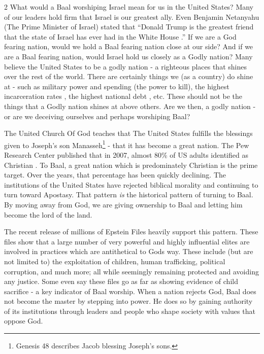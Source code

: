 \documentclass[10pt]{article}
\begin{document}
\begin{multicols}{2}
What would a Baal worshiping Israel mean for us in the United States? Many of our leaders hold firm that Israel is our greatest ally. Even Benjamin Netanyahu (The Prime Minister of Israel) stated that ``Donald Trump is the greatest friend that the state of Israel has ever had in the White House \cite{msn}.'' If we are a God fearing nation, would we hold a Baal fearing nation close at our side? And if we are a Baal fearing nation, would Israel hold us closely as a Godly nation? Many believe the United States to be a godly nation - a righteous places that shines over the rest of the world. There are certainly things we (as a country) do shine at - such as military power and spending (the power to kill)\cite{SIPRI}, the highest incarceration rates \cite{prisonpolicy}, the highest national debt \cite{economic comittee, traasuryDirect}, etc. These should not be the things that a Godly nation shines at above others. Are we then, a godly nation - or are we deceiving ourselves and perhaps worshiping Baal?

The United Church Of God teaches that The United States fulfills the blessings given to Joseph's son Manasseh\footnote{Genesis 48 describes Jacob blessing Joseph's sons.} \cite{UCG Prophecy} - that it has become a great nation. The Pew Research Center published that in 2007, almost 80\% of US adults identified as Christian \cite{Christianity Percent}. To Baal, a great nation which is predominately Christian is the prime target. Over the years, that percentage has been quickly declining. The institutions of the United States have rejected biblical morality and continuing to turn toward Apostasy. That pattern \textit{is} the historical pattern of turning to Baal. By moving away from God, we are giving ownership to Baal and letting him become the lord of the land. 

The recent release of millions of Epstein Files heavily support this pattern. These files show that a large number of very powerful and highly influential elites are involved in practices which are antithetical to Gods way. These include (but are not limited to) the exploitation of children, human trafficking, political corruption, and much more; all while seemingly remaining protected and avoiding any justice. Some even say these files go as far as showing evidence of child sacrifice - a key indicator of Baal worship. When a nation rejects God, Baal does not become the master by stepping into power. He does so by gaining authority of its institutions through leaders and people who shape society with values that oppose God.


\end{multicols}
\end{document}
